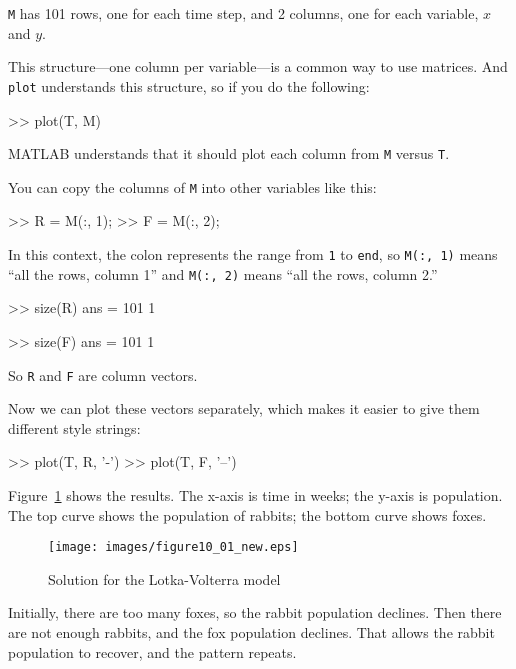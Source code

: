 \lstinline{M} has 101 rows, one for each time step, and 2 columns, one for each variable,
$x$ and $y$.

This structure---one column per variable---is a common way to
use matrices. And \lstinline{plot} understands this structure, so if you
do the following:

\begin{code}
>> plot(T, M)
\end{code}
MATLAB understands that it should plot each column from \lstinline{M}
versus \lstinline{T}.


You can copy the columns of \lstinline{M} into other variables like
this:

\begin{code}
>> R = M(:, 1);
>> F = M(:, 2);
\end{code}

In this context, the colon represents the range from \lstinline{1} to \lstinline{end},
so \lstinline{M(:, 1)} means ``all the rows, column 1'' and
\lstinline{M(:, 2)} means ``all the rows, column 2.''

\begin{code}
>> size(R)
ans = 101     1

>> size(F)
ans = 101     1
\end{code}

So \lstinline{R} and \lstinline{F} are column vectors.


Now we can plot these vectors separately, which makes it easier to give them different style strings:

\begin{code}
>> plot(T, R, '-')
>> plot(T, F, '--')
\end{code}


Figure~\ref{fig:lotka} shows the results. The x-axis is time in weeks; the y-axis is population.  The top curve shows the population of rabbits; the bottom curve shows foxes.

\begin{figure}[h]
\centerline{\texttt{[image: images/figure10\_01\_new.eps]}}
\caption{Solution for the Lotka-Volterra model}
\label{fig:lotka}
\end{figure}


Initially, there are too many foxes, so the rabbit population declines.  Then there are not enough rabbits, and the fox population declines.  That allows the rabbit population to recover, and the pattern repeats.

